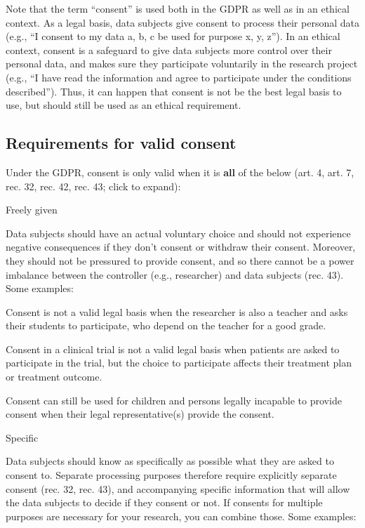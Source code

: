 \documentclass[
]{book}
\begin{document}
Note that the term ``consent'' is used both in the GDPR as well as in an ethical
context. As a legal basis, data subjects give consent
to process their personal data (e.g., ``I consent to my data a, b, c be used for
purpose x, y, z''). In an ethical context, consent is a
safeguard
to give data subjects more control over their personal data, and makes sure they
participate voluntarily in the research project (e.g., ``I have read the
information and agree to participate under the conditions described''). Thus, it
can happen that consent is not be the best legal basis to use, but should still
be used as an ethical requirement.

\hypertarget{consent-requirements}{%
\subsection{Requirements for valid consent}\label{consent-requirements}}

Under the GDPR, consent is only valid when it is \textbf{all} of the below
(art. 4,
art. 7,
rec. 32,
rec. 42,
rec. 43;
click to expand):

Freely given

Data subjects should have an actual voluntary choice and should not experience
negative consequences if they don't consent or withdraw their consent. Moreover,
they should not be pressured to provide consent, and so there cannot be a power
imbalance between the controller (e.g., researcher) and data subjects
(rec. 43).
Some examples:

Consent is not a valid legal basis when the researcher is also a
teacher and asks their students to participate, who depend on the teacher
for a good grade.

Consent in a clinical trial is not a valid legal basis when patients
are asked to participate in the trial, but the choice to participate
affects their treatment plan or treatment outcome.

Consent can still be used for children and persons legally incapable to
provide consent when their legal representative(s) provide the consent.

Specific

Data subjects should know as specifically as possible what they are asked to
consent to. Separate processing purposes therefore require explicitly separate
consent (rec. 32,
rec. 43), and
accompanying specific information that will allow the data subjects to decide
if they consent or not. If consents for multiple purposes are necessary for your
research, you can combine those.
Some examples:
\end{document}
